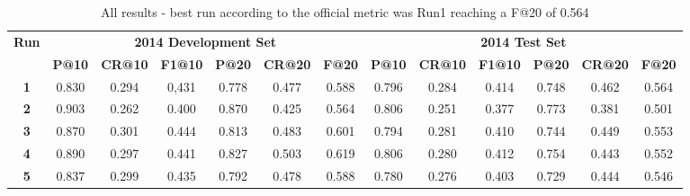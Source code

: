 
\begin{table*}[hbt]
\scriptsize
\centering
\caption{All results - best run according to the official metric was Run1 reaching a F@20 of 0.564}
\vspace{-0.25cm}
\label{table:results}
\begin{tabular}{c|c|c|c|c|c|c|c|c|c|c|c|c}
\toprule 
\multirow{2}{*}{\textbf{Run}} & \multicolumn{6}{c|}{\textbf{2014 Development Set}} & \multicolumn{6}{c}{\textbf{2014 Test Set}}\tabularnewline
\cmidrule{2-13} 
 & \textbf{P@10} & \textbf{CR@10} & \textbf{F1@10} & \textbf{P@20} & \textbf{CR@20} & \textbf{F@20} & \textbf{P@10} & \textbf{CR@10} & \textbf{F1@10} & \textbf{P@20} & \textbf{CR@20} & \textbf{F@20}\tabularnewline
\midrule
\textbf{1} & 0.830 & 0.294 & 0,431 & 0.778 & 0.477 & 0.588 & 0.796 & 0.284  & 0.414  & 0.748  & 0.462  & 0.564\tabularnewline
\textbf{2} & 0.903 & 0.262 & 0.400 & 0.870 & 0.425 & 0.564 & 0.806 & 0.251  & 0.377  & 0.773  & 0.381  & 0.501\tabularnewline
\textbf{3} & 0.870 & 0.301 & 0.444 & 0.813 & 0.483 & 0.601 & 0.794 & 0.281  & 0.410  & 0.744  & 0.449  & 0.553\tabularnewline
\textbf{4} & 0.890 & 0.297 & 0.441 & 0.827 & 0.503 & 0.619 & 0.806 & 0.280 & 0.412 & 0.754  & 0.443 &  0.552\tabularnewline
\textbf{5} & 0.837 & 0.299 & 0.435 & 0.792 & 0.478 & 0.588 & 0.780 & 0.276 & 0.403 & 0.729 & 0.444 &  0.546\tabularnewline
\bottomrule 
\end{tabular}
\end{table*}


